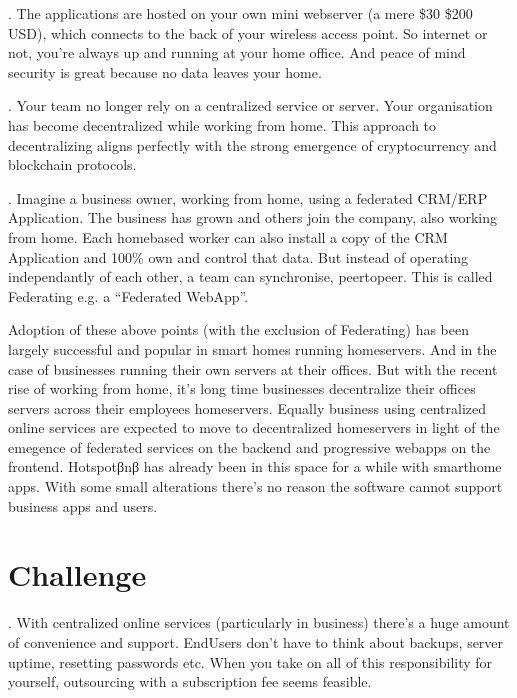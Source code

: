 \documentclass[letterpaper,10pt,openany,oneside,english]{sphinxmanual}
\begin{document}
.  The applications are hosted on your own mini webserver (a mere \$30 \sphinxhyphen{} \$200 USD), which connects to the back of your wireless access point.
So internet or not, you’re always up and running at your home office. And peace of mind security is great because no data leaves your home.

.  Your team no longer rely on a centralized service or server. Your organisation has become de\sphinxhyphen{}centralized while working from home.
This approach to decentralizing aligns perfectly with the strong emergence of cryptocurrency and blockchain protocols.

.  Imagine a business owner, working from home, using a federated CRM/ERP Application.
The business has grown and others join the company, also working from home.
Each home\sphinxhyphen{}based worker can also install a copy of the CRM Application and 100\% own and control that data.
But instead of operating independantly of each other, a team can synchronise, peer\sphinxhyphen{}to\sphinxhyphen{}peer.
This is called Federating e.g. a “Federated WebApp”.

\sphinxAtStartPar
Adoption of these above points (with the exclusion of Federating) has been largely successful and popular in smart homes running homeservers.
And in the case of businesses running their own servers at their offices.
But with the recent rise of working from home, it’s long time businesses decentralize their offices servers across their employees homeservers.
Equally business using centralized online services are expected to move to decentralized homeservers in light of the emegence of federated services on the backend and progressive webapps on the front\sphinxhyphen{}end.
Hotspotβnβ has already been in this space for a while with smarthome apps. With some small alterations there’s no reason the software cannot support business apps and users.


\section{Challenge}
\label{\detokenize{executivesummary:challenge}}
. With centralized online services (particularly in business) there’s a huge amount of convenience and support. End\sphinxhyphen{}Users don’t have to think about backups, server uptime, resetting passwords etc.
When you take on all of this responsibility for yourself, outsourcing with a subscription fee seems feasible.
\end{document}
